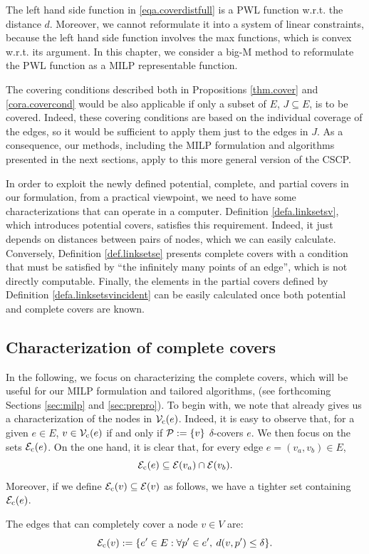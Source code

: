 \begin{remark}
    The left hand side function in \eqref{eqa.coverdistfull} is a PWL function w.r.t.  the distance $d$. Moreover, we cannot reformulate it into a system of linear constraints,  because the left hand side function involves the max functions, which is convex w.r.t. its argument. In this chapter, we consider a big-M method to reformulate the PWL function as a MILP representable function.
\end{remark}

\begin{remark}
The covering conditions described both in Propositions \ref{thm.cover} and \ref{cora.covercond} would be also applicable if only a subset of $E$, $J\subseteq E$, is to be covered. Indeed, these covering conditions are based on the individual coverage of the edges, so it would be sufficient to apply them just to the edges in $J$. As a consequence, our methods, including the MILP formulation and algorithms presented in the next sections, apply to this more general version of the CSCP.
\end{remark}



In order to exploit the newly defined potential, complete, and partial covers in our formulation, from a practical viewpoint, we need to have some characterizations that can operate in a computer. Definition \ref{defa.linksetsv}, which introduces potential covers, satisfies this requirement. Indeed, it just depends on distances between pairs of nodes, which we can easily calculate. Conversely, Definition \ref{def.linksetse} presents complete covers with a condition that must be satisfied by ``the infinitely many points of an edge'', which is not directly computable. Finally, the elements in the partial covers defined by Definition \ref{defa.linksetsvincident} can be easily calculated once both potential and complete covers are known.

\subsection{Characterization of complete covers}

In the following, we focus on characterizing the complete covers, which will be useful for our MILP formulation and tailored algorithms, (see forthcoming Sections \ref{sec:milp} and \ref{sec:prepro}). To begin with, we note that  already gives us a characterization of the nodes in $\mathcal V_{\mathrm{c}}(e)$. Indeed, it is easy to observe that, for a given $e\in E$, $v\in \mathcal V_{\mathrm{c}}(e)$ if and only if $\mathcal P:=\{v\}$ $\delta$-covers $e$. We then focus on the sets ${\mathcal E}_{\mathrm{c}}(e)$. On the one hand, it is clear that, for every edge $e=(v_a,v_b)\in E$,
$${\mathcal E}_{\mathrm{c}}(e)\subseteq {\mathcal E}(v_a)\cap {\mathcal E}(v_b).$$
Moreover, if we define ${\mathcal E}_{\mathrm{c}}(v)\subseteq {\mathcal E}(v)$ as follows, we have a tighter set containing ${\mathcal E}_{\mathrm{c}}(e)$.
\begin{definition}\label{def.cEc}
The edges that can completely cover a node $v \in V$ are:
$${\mathcal E}_{\mathrm{c}}(v) :=\{e' \in E:   \forall p' \in e',\:   d(v,p') \le \delta\}.$$
\end{definition}

